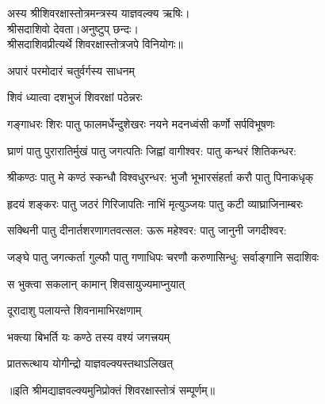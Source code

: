 
\clearpage
{}
अस्य श्रीशिवरक्षास्तोत्रमन्त्रस्य याज्ञवल्क्य ऋषिः।\\ 
श्रीसदाशिवो देवता।अनुष्टुप् छन्दः।\\ 
श्रीसदाशिवप्रीत्यर्थे शिवरक्षास्तोत्रजपे विनियोगः॥

{अपारं परमोदारं चतुर्वर्गस्य साधनम्}

{शिवं ध्यात्वा दशभुजं शिवरक्षां पठेन्नरः}


\resetShloka
\twolineshloka
{गङ्गाधरः शिरः पातु फालमर्धेन्दुशेखरः}
{नयने मदनध्वंसी कर्णो सर्पविभूषणः} 

\twolineshloka
{घ्राणं पातु पुरारातिर्मुखं पातु जगत्पतिः}
{जिह्वां वागीश्वर: पातु कन्धरं शितिकन्धर:}

\twolineshloka
{श्रीकण्ठः पातु मे कण्ठं स्कन्धौ विश्वधुरन्धर:}
{भुजौ भूभारसंहर्ता करौ पातु पिनाकधृक्}

\twolineshloka
{हृदयं शङ्करः पातु जठरं गिरिजापतिः}
{नाभिं मृत्युञ्जयः पातु कटी व्याघ्राजिनाम्बरः}

\twolineshloka
{सक्थिनी पातु दीनार्तशरणागतवत्सल:}
{ऊरू महेश्वर: पातु जानुनी जगदीश्वर:}

\twolineshloka
{जङ्घे पातु जगत्कर्ता गुल्फौ पातु गणाधिपः}
{चरणौ करुणासिन्धु: सर्वाङ्गानि सदाशिवः}

{स भुक्त्वा सकलान् कामान् शिवसायुज्यमाप्नुयात्}

{दूरादाशु पलायन्ते शिवनामाभिरक्षणाम्}

{भक्त्या बिभर्ति यः कण्ठे तस्य वश्यं जगत्त्रयम्}

{प्रातरूत्थाय योगीन्द्रो याज्ञवल्क्यस्तथाऽलिखत्}

॥इति श्रीमद्याज्ञवल्क्यमुनिप्रोक्तं शिवरक्षास्तोत्रं सम्पूर्णम्॥